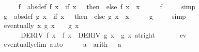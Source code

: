 \begin{isabellebody}
%
\isadelimproof
%
\endisadelimproof
%
\isatagproof
{}\isamarkupfalse%
\ {\isacharminus}{\kern0pt}\isanewline
\ \ \isamarkupfalse%
\ f\ \ {\isacharbrackleft}{\kern0pt}abs{\isacharunderscore}{\kern0pt}def{\isacharbrackright}{\kern0pt}{\isacharcolon}{\kern0pt}\ {\isachardoublequoteopen}f\ x\ {\isacharequal}{\kern0pt}\ {\isacharparenleft}{\kern0pt}if\ x\ {\isasymle}\ {}\ then\ {}\ else\ f{}\ x{\isacharparenright}{\kern0pt}{\isachardoublequoteclose}\ \ x\isanewline
\ \ \isamarkupfalse%
\ \isamarkupfalse%
\ {\isachardoublequoteopen}f\ {}\ {\isacharequal}{\kern0pt}\ {}{\isachardoublequoteclose}\ \isamarkupfalse%
\ simp\isanewline
\isanewline
\ \ \isamarkupfalse%
\ g\ \ {\isacharbrackleft}{\kern0pt}abs{\isacharunderscore}{\kern0pt}def{\isacharbrackright}{\kern0pt}{\isacharcolon}{\kern0pt}\ {\isachardoublequoteopen}g\ x\ {\isacharequal}{\kern0pt}\ {\isacharparenleft}{\kern0pt}if\ x\ {\isasymle}\ {}\ then\ {}\ else\ g{}\ x{\isacharparenright}{\kern0pt}{\isachardoublequoteclose}\ \ x\isanewline
\ \ \isamarkupfalse%
\ \isamarkupfalse%
\ {\isachardoublequoteopen}g\ {}\ {\isacharequal}{\kern0pt}\ {}{\isachardoublequoteclose}\ \isamarkupfalse%
\ simp\isanewline
\isanewline
\ \ \isamarkupfalse%
\ {\isachardoublequoteopen}eventually\ {\isacharparenleft}{\kern0pt}{\isasymlambda}x{\isachardot}{\kern0pt}\ g{}\ x\ {\isasymnoteq}\ {}\ {\isasymand}\ g{\isacharprime}{\kern0pt}\ x\ {\isasymnoteq}\ {}\ {\isasymand}\isanewline
\ \ \ \ \ \ DERIV\ f{}\ x\ {\isacharcolon}{\kern0pt}{\isachargreater}{\kern0pt}\ {\isacharparenleft}{\kern0pt}f{\isacharprime}{\kern0pt}\ x{\isacharparenright}{\kern0pt}\ {\isasymand}\ DERIV\ g{}\ x\ {\isacharcolon}{\kern0pt}{\isachargreater}{\kern0pt}\ {\isacharparenleft}{\kern0pt}g{\isacharprime}{\kern0pt}\ x{\isacharparenright}{\kern0pt}{\isacharparenright}{\kern0pt}\ {\isacharparenleft}{\kern0pt}at{\isacharunderscore}{\kern0pt}right\ {}{\isacharparenright}{\kern0pt}{\isachardoublequoteclose}\isanewline
\ \ \ \ \isamarkupfalse%
\ ev\ \isamarkupfalse%
\ eventually{\isacharunderscore}{\kern0pt}elim\ auto\isanewline
\ \ \isamarkupfalse%
\ \isamarkupfalse%
\ a\ \ {\isacharbrackleft}{\kern0pt}arith{\isacharbrackright}{\kern0pt}{\isacharcolon}{\kern0pt}\ {\isachardoublequoteopen}{}\ {\isacharless}{\kern0pt}\ a{\isachardoublequoteclose}\isanewline

\end{isabellebody}
